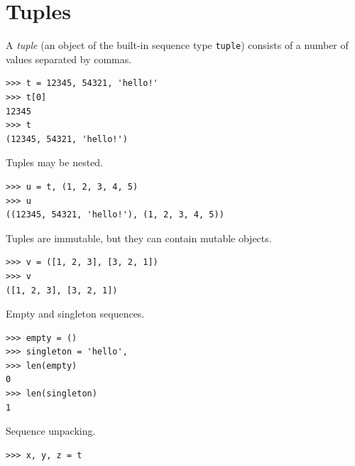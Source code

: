 \documentclass[8pt,a4paper,compress,handout]{beamer}
\begin{document}
\section{Tuples}
\begin{frame}[fragile]
A \emph{tuple} (an object of the built-in sequence type \lstinline{tuple}) consists of a number of values separated by commas.
\begin{lstlisting}[language={}]
>>> t = 12345, 54321, 'hello!'
>>> t[0]
12345
>>> t
(12345, 54321, 'hello!')
\end{lstlisting}

\bigskip

Tuples may be nested.
\begin{lstlisting}[language={}]
>>> u = t, (1, 2, 3, 4, 5)
>>> u
((12345, 54321, 'hello!'), (1, 2, 3, 4, 5))
\end{lstlisting}

\bigskip

Tuples are immutable, but they can contain mutable objects.
\begin{lstlisting}[language={}]
>>> v = ([1, 2, 3], [3, 2, 1])
>>> v
([1, 2, 3], [3, 2, 1])
\end{lstlisting}

\bigskip

Empty and singleton sequences.
\begin{lstlisting}[language={}]
>>> empty = ()
>>> singleton = 'hello', 
>>> len(empty)
0
>>> len(singleton)
1
\end{lstlisting}

\bigskip

Sequence unpacking.
\begin{lstlisting}[language={}]
>>> x, y, z = t
\end{lstlisting}
\end{frame}
\end{document}
